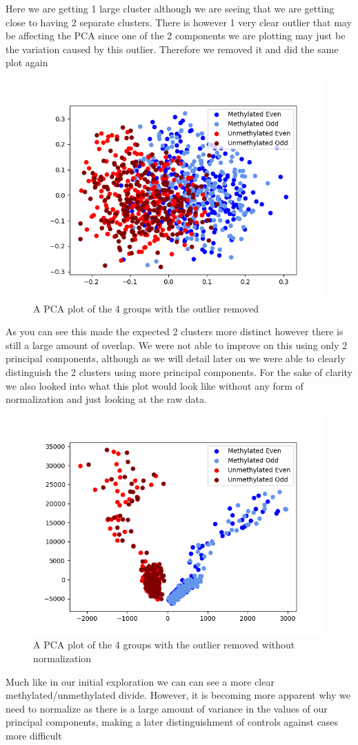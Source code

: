 Here we are getting 1 large cluster although we are seeing that we are getting close to having 2 separate clusters. There is however 1 very clear outlier that may be affecting the PCA since one of the 2 components we are plotting may just be the variation caused by this outlier. Therefore we removed it and did the same plot again

\begin{figure}[H]
	\centering
	\includegraphics[width=0.7\linewidth]{../../figures/exploration/all_healthy/all_healthy_outlier_removed.png}
	\caption{A PCA plot of the 4 groups with the outlier removed}
	\label{fig:allhealthy1}
\end{figure}

As you can see this made the expected 2 clusters more distinct however there is still a large amount of overlap. We were not able to improve on this using only 2 principal components, although as we will detail later on we were able to clearly distinguish the 2 clusters using more principal components. 
For the sake of clarity we also looked into what this plot would look like without any form of normalization and just looking at the raw data.

\begin{figure}[H]
	\centering
	\includegraphics[width=0.7\linewidth]{../../figures/exploration/all_healthy/all_healthy_outlier_removed_raw.png}
	\caption{A PCA plot of the 4 groups with the outlier removed without normalization}
	\label{fig:allhealthy2}
\end{figure}

Much like in our initial exploration we can can see a more clear methylated/unmethylated divide. However, it is becoming more apparent why we need to normalize as there is a large amount of variance in the values of our principal components, making a later distinguishment of controls against cases more difficult 